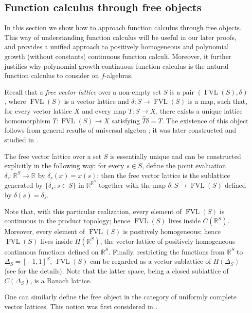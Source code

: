 \documentclass{amsart}
\theoremstyle{plain}
\theoremstyle{definition}
\theoremstyle{remark}
\newcommand\R{\ensuremath{\mathbb{R}}}
\newcommand{\falg}{$f\!$-algebra}
\newcommand{\FVL}[1]{\operatorname{FVL}(#1)}
\begin{document}
\subsection{Function calculus through free objects}

In this section we show how to approach function calculus through free
objects. This way of understanding function calculus will be useful in
our later proofs, and provides a unified approach to positively
homogeneous and polynomial growth (without constants) continuous function
calculi. Moreover, it further justifies why polynomial growth
continuous function calculus is the natural function calculus to
consider on \falg s.

Recall that a \emph{free vector lattice} over a non-empty set $S$ is a
pair $(\FVL S,\delta)$, where $\FVL S$ is a vector lattice and $\delta
\colon S\to \FVL S$ is a map, such that, for every vector lattice $X$
and every map $T\colon S\to X$, there exists a unique lattice
homomorphism $\hat{T}\colon \FVL S\to X$ satisfying $\hat{T}\delta =T$.
The existence of this object follows from general results of universal
algebra \cite[pp.~143--144]{birkhoff1967}; it was later
constructed and studied in \cite{baker1968,bleier1973}.

The free vector lattice over a set $S$ is essentially unique and can
be constructed explicitly in the following way: for every $s \in S$, define the point evaluation $\delta _s\colon \R^{S}\to \R$ by
$\delta _s(x)=x(s)$; then the free vector lattice is the sublattice generated by
$\{\delta _s:s \in S\}$ in $\R^{\R^{S}}$ together with the map
$\delta\colon S\to \FVL S$ defined by $\delta (s)=\delta _s$.

Note that, with this particular realization, every element of $\FVL S$ is
continuous in the product topology; hence $\FVL S$ lives inside
$C(\R^{S})$. Moreover, every element of $\FVL S$ is positively
homogeneous; hence $\FVL S$ lives inside $H(\R^{S})$, the vector
lattice of positively homogeneous continuous functions defined on $\R^{S}$.
Finally, restricting the functions from $\R^{S}$ to $\Delta
_S=[-1,1]^{S}$, $\FVL S$ can be regarded as a vector sublattice of
$H(\Delta _S)$ (see \cite[Lemma 5.1]{de_pagter_wickstead2015} for the
details). Note that the latter space, being a closed sublattice
of $C(\Delta _S)$, is a Banach lattice.

One can similarly define the free object in the category of uniformly
complete vector lattices. This notion was first considered in
\cite{emelyanov_gorokhova2024}.
\end{document}
